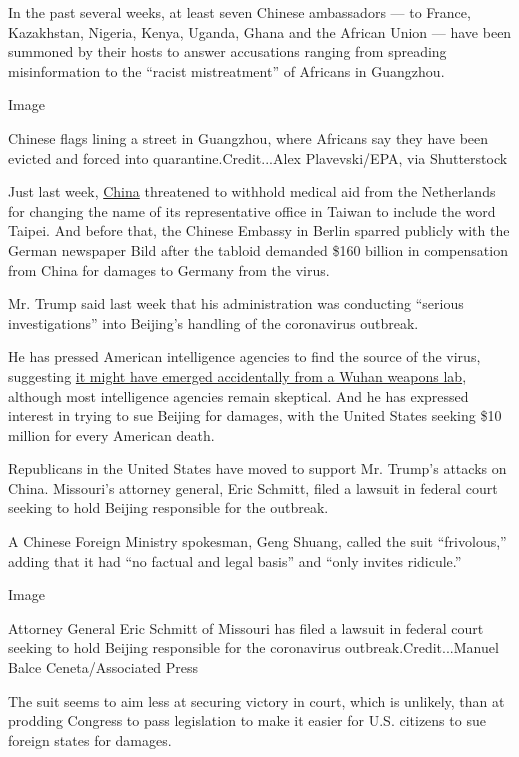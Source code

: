 In the past several weeks, at least seven Chinese ambassadors --- to
France, Kazakhstan, Nigeria, Kenya, Uganda, Ghana and the African Union
--- have been summoned by their hosts to answer accusations ranging from
spreading misinformation to the ``racist mistreatment'' of Africans in
Guangzhou.

Image

Chinese flags lining a street in Guangzhou, where Africans say they have
been evicted and forced into quarantine.Credit...Alex Plavevski/EPA, via
Shutterstock

Just last week,
\href{https://www.nytimes3xbfgragh.onion/2020/06/15/world/asia/beijing-coronavirus-outbreak.html}{China}
threatened to withhold medical aid from the Netherlands for changing the
name of its representative office in Taiwan to include the word Taipei.
And before that, the Chinese Embassy in Berlin sparred publicly with the
German newspaper Bild after the tabloid demanded \$160 billion in
compensation from China for damages to Germany from the virus.

Mr. Trump said last week that his administration was conducting
``serious investigations'' into Beijing's handling of the coronavirus
outbreak.

He has pressed American intelligence agencies to find the source of the
virus, suggesting
\href{https://www.nytimes3xbfgragh.onion/2020/04/30/us/politics/trump-administration-intelligence-coronavirus-china.html}{it
might have emerged accidentally from a Wuhan weapons lab}, although most
intelligence agencies remain skeptical. And he has expressed interest in
trying to sue Beijing for damages, with the United States seeking \$10
million for every American death.

Republicans in the United States have moved to support Mr. Trump's
attacks on China. Missouri's attorney general, Eric Schmitt, filed a
lawsuit in federal court seeking to hold Beijing responsible for the
outbreak.

A Chinese Foreign Ministry spokesman, Geng Shuang, called the suit
``frivolous,'' adding that it had ``no factual and legal basis'' and
``only invites ridicule.''

Image

Attorney General Eric Schmitt of Missouri has filed a lawsuit in federal
court seeking to hold Beijing responsible for the coronavirus
outbreak.Credit...Manuel Balce Ceneta/Associated Press

The suit seems to aim less at securing victory in court, which is
unlikely, than at prodding Congress to pass legislation to make it
easier for U.S. citizens to sue foreign states for damages.

